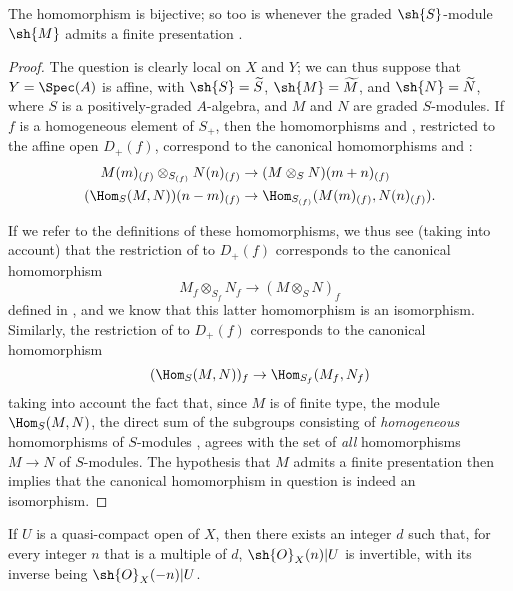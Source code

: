 
\begin{proposition}[8.14.3]
\label{II.8.14.3}
The homomorphism  is bijective;
so too is  whenever the graded $\sh{S}$-module $\sh{M}$ admits a finite presentation .
\end{proposition}

\begin{proof}
\label{proof-II.8.14.3}
The question is clearly local on $X$ and $Y$;
we can thus suppose that $Y=\Spec(A)$ is affine, with $\sh{S}=\widetilde{S}$, $\sh{M}=\widetilde{M}$, and $\sh{N}=\widetilde{N}$, where $S$ is a positively-graded $A$-algebra, and $M$ and $N$ are graded $S$-modules.
If $f$ is a homogeneous element of $S_+$, then the homomorphisms  and , restricted to the affine open $D_+(f)$, correspond to the canonical homomorphisms  and :
\begin{align*}
    M(m)_{(f)}\otimes_{S_{(f)}}N(n)_{(f)}
    &\to
    (M\otimes_S N)(m+n)_{(f)}
\\  (\Hom_S(M,N))(n-m)_{(f)}
    &\to
    \Hom_{S_{(f)}}(M(m)_{(f)},N(n)_{(f)}).
\end{align*}

If we refer to the definitions of these homomorphisms, we thus see (taking  into account) that the restriction of  to $D_+(f)$ corresponds to the canonical homomorphism
\[
    M_f\otimes_{S_f}N_f \to (M\otimes_S N)_f
\]
defined in , and we know that this latter homomorphism is an isomorphism.
Similarly, the restriction of  to $D_+(f)$ corresponds to the canonical homomorphism 
\[
    (\Hom_S(M,N))_f \to \Hom_{S_f}(M_f,N_f)
\]
taking into account the fact that, since $M$ is of finite type, the module $\Hom_S(M,N)$, the direct sum of the subgroups consisting of \emph{homogeneous} homomorphisms of $S$-modules , agrees with the set of \emph{all} homomorphisms $M\to N$ of $S$-modules.
The hypothesis that $M$ admits a finite presentation then implies  that the canonical homomorphism in question is indeed an isomorphism.
\end{proof}

\begin{proposition}[8.14.4]
\label{II.8.14.4}
If $U$ is a quasi-compact open of $X$, then there exists an integer $d$ such that, for every integer $n$ that is a multiple of $d$, $\sh{O}_X(n)|U$ is invertible, with its inverse being $\sh{O}_X(-n)|U$.
\end{proposition}

